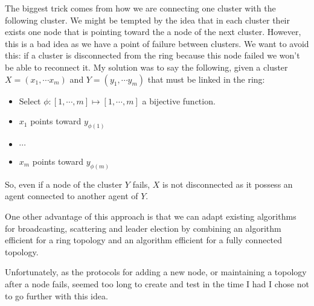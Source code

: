 \documentclass[a4paper]{article}
\begin{document}
The biggest trick comes from how we are connecting one cluster with the following cluster. We might be tempted by the idea that in each cluster their exists one node that is pointing toward the a node of the next cluster. However, this is a bad idea as we have a point of failure between clusters. We want to avoid this: if a cluster is disconnected from the ring because this node failed we won't be able to reconnect it. My solution was to say the following, given a cluster $X = (x_1, \cdots x_m)$ and $Y = (y_1, \cdots y_m)$ that must be linked in the ring:
\begin{itemize}
    \item Select $\phi: [1, \cdots, m] \mapsto [1, \cdots, m]$ a bijective function.
    \item $x_1$ points toward $y_{\phi(1)}$
    \item $\cdots$
    \item $x_m$ points toward $y_{\phi(m)}$
\end{itemize}

So, even if a node of the cluster $Y$ fails, $X$ is not disconnected as it possess an agent connected to another agent of $Y$.

One other advantage of this approach is that we can adapt existing algorithms for broadcasting, scattering and leader election by combining an algorithm efficient for a ring topology and an algorithm efficient for a fully connected topology.

Unfortunately, as the protocols for adding a new node, or maintaining a topology after a node fails, seemed too long to create and test in the time I had I chose not to go further with this idea.
\end{document}
